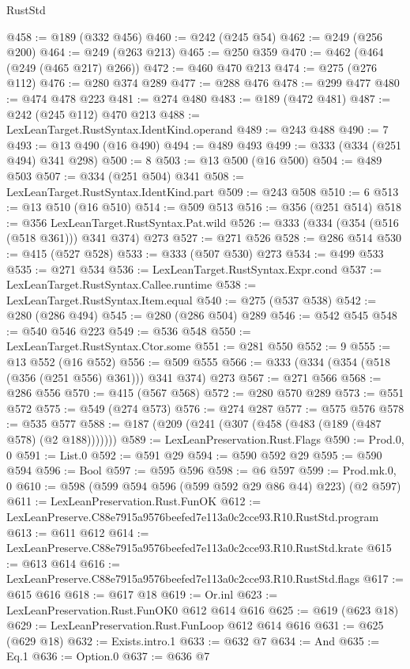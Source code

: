 \begin{lexlean}{RustStd}
\begin{coremodule}
@458 := @189 (@332 @456)
@460 := @242 (@245 @54)
@462 := @249 (@256 @200)
@464 := @249 (@263 @213)
@465 := @250 @359
@470 := @462 (@464 (@249 (@465 @217) @266))
@472 := @460 @470 @213
@474 := @275 (@276 @112)
@476 := @280 @374 @289
@477 := @288 @476
@478 := @299 @477
@480 := @474 @478 @223
@481 := @274 @480
@483 := @189 (@472 @481)
@487 := @242 (@245 @112) @470 @213
@488 := LexLeanTarget.RustSyntax.IdentKind.operand
@489 := @243 @488
@490 := 7
@493 := @13 @490 (@16 @490)
@494 := @489 @493
@499 := @333 (@334 (@251 @494) @341 @298)
@500 := 8
@503 := @13 @500 (@16 @500)
@504 := @489 @503
@507 := @334 (@251 @504) @341
@508 := LexLeanTarget.RustSyntax.IdentKind.part
@509 := @243 @508
@510 := 6
@513 := @13 @510 (@16 @510)
@514 := @509 @513
@516 := @356 (@251 @514)
@518 := @356 LexLeanTarget.RustSyntax.Pat.wild
@526 := @333 (@334 (@354 (@516 (@518 @361))) @341 @374) @273
@527 := @271 @526
@528 := @286 @514
@530 := @415 (@527 @528)
@533 := @333 (@507 @530) @273
@534 := @499 @533
@535 := @271 @534
@536 := LexLeanTarget.RustSyntax.Expr.cond
@537 := LexLeanTarget.RustSyntax.Callee.runtime
@538 := LexLeanTarget.RustSyntax.Item.equal
@540 := @275 (@537 @538)
@542 := @280 (@286 @494)
@545 := @280 (@286 @504) @289
@546 := @542 @545
@548 := @540 @546 @223
@549 := @536 @548
@550 := LexLeanTarget.RustSyntax.Ctor.some
@551 := @281 @550
@552 := 9
@555 := @13 @552 (@16 @552)
@556 := @509 @555
@566 := @333 (@334 (@354 (@518 (@356 (@251 @556) @361))) @341 @374) @273
@567 := @271 @566
@568 := @286 @556
@570 := @415 (@567 @568)
@572 := @280 @570 @289
@573 := @551 @572
@575 := @549 (@274 @573)
@576 := @274 @287
@577 := @575 @576
@578 := @535 @577
@588 := @187 (@209 (@241 (@307 (@458 (@483 (@189 (@487 @578) (@2 @188)))))))
@589 := LexLeanPreservation.Rust.Flags
@590 := Prod.{0, 0}
@591 := List.{0}
@592 := @591 @29
@594 := @590 @592 @29
@595 := @590 @594
@596 := Bool
@597 := @595 @596
@598 := @6 @597
@599 := Prod.mk.{0, 0}
@610 := @598 (@599 @594 @596 (@599 @592 @29 @86 @44) @223) (@2 @597)
@611 := LexLeanPreservation.Rust.FunOK
@612 := LexLeanPreserve.C88e7915a9576beefed7e113a0c2cce93.R10.RustStd.program
@613 := @611 @612
@614 := LexLeanPreserve.C88e7915a9576beefed7e113a0c2cce93.R10.RustStd.krate
@615 := @613 @614
@616 := LexLeanPreserve.C88e7915a9576beefed7e113a0c2cce93.R10.RustStd.flags
@617 := @615 @616
@618 := @617 @18
@619 := Or.inl
@623 := LexLeanPreservation.Rust.FunOK0 @612 @614 @616
@625 := @619 (@623 @18)
@629 := LexLeanPreservation.Rust.FunLoop @612 @614 @616
@631 := @625 (@629 @18)
@632 := Exists.intro.{1}
@633 := @632 @7
@634 := And
@635 := Eq.{1}
@636 := Option.{0}
@637 := @636 @7

\end{coremodule}
\end{lexlean}
